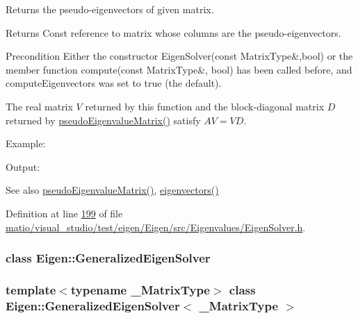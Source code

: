 Returns the pseudo-\/eigenvectors of given matrix. 

\begin{DoxyReturn}{Returns}
Const reference to matrix whose columns are the pseudo-\/eigenvectors.
\end{DoxyReturn}
\begin{DoxyPrecond}{Precondition}
Either the constructor Eigen\+Solver(const Matrix\+Type\&,bool) or the member function compute(const Matrix\+Type\&, bool) has been called before, and {\ttfamily compute\+Eigenvectors} was set to true (the default).
\end{DoxyPrecond}
The real matrix $ V $ returned by this function and the block-\/diagonal matrix $ D $ returned by \hyperlink{group___eigenvalues___module_a4979eafe0aeef06b19ada7fa5e19db17}{pseudo\+Eigenvalue\+Matrix()} satisfy $ AV = VD $.

Example\+: 
\begin{DoxyCodeInclude}
\end{DoxyCodeInclude}
 Output\+: 
\begin{DoxyVerbInclude}
\end{DoxyVerbInclude}


\begin{DoxySeeAlso}{See also}
\hyperlink{group___eigenvalues___module_a4979eafe0aeef06b19ada7fa5e19db17}{pseudo\+Eigenvalue\+Matrix()}, \hyperlink{group___eigenvalues___module_a66288022802172e3ee059283b26201d7}{eigenvectors()} 
\end{DoxySeeAlso}


Definition at line \hyperlink{matio_2visual__studio_2test_2eigen_2_eigen_2src_2_eigenvalues_2_eigen_solver_8h_source_l00199}{199} of file \hyperlink{matio_2visual__studio_2test_2eigen_2_eigen_2src_2_eigenvalues_2_eigen_solver_8h_source}{matio/visual\+\_\+studio/test/eigen/\+Eigen/src/\+Eigenvalues/\+Eigen\+Solver.\+h}.

\label{class_eigen_1_1_generalized_eigen_solver}
\subsubsection{class Eigen\+:\+:Generalized\+Eigen\+Solver}
\subsubsection*{template$<$typename \+\_\+\+Matrix\+Type$>$\newline
class Eigen\+::\+Generalized\+Eigen\+Solver$<$ \+\_\+\+Matrix\+Type $>$}

